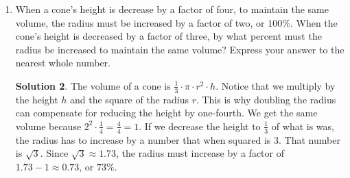 \documentclass{article}
\theoremstyle{definition}
\newtheorem*{solution}{Solution}
\begin{document}
\begin{multicols}{2}
\begin{enumerate}
\begin{solution}
\begin{center}
                \end{center}
            \end{solution}
        \item When a cone's height is decrease by a factor of four, to maintain the same volume, the radius must be increased by a factor of two, or $100\%$.
            When the cone's height is decreased by a factor of three, by what percent must the radius be increased to maintain the same volume?
            Express your answer to the nearest whole number.
            \begin{solution}
                The volume of a cone is $\frac{1}{3} \cdot \pi \cdot r^2 \cdot h$.
                Notice that we multiply by the height $h$ and the square of the radius $r$.
                This is why doubling the radius can compensate for reducing the height by one-fourth.
                We get the same volume because $2^2 \cdot \frac{1}{4} = \frac{4}{4} = 1$.
                If we decrease the height to $\frac{1}{3}$ of what is was, the radius has to increase by a number that when squared is $3$.
                That number is $\sqrt{3}$.
                Since $\sqrt{3} \approx 1.73$, the radius must increase by a factor of $1.73 - 1 \approx 0.73$, or $73\%$.
            \end{solution}
    \end{enumerate}
\end{multicols}
\end{document}
